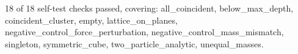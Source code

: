 18 of 18 self-test checks passed, covering: all\_coincident, below\_max\_depth, coincident\_cluster, empty, lattice\_on\_planes, negative\_control\_force\_perturbation, negative\_control\_mass\_mismatch, singleton, symmetric\_cube, two\_particle\_analytic, unequal\_masses.
